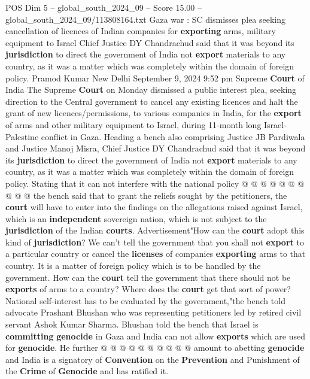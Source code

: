 \begin{textsample}{POS Dim 5 – global\_south\_2024\_09 – Score 15.00 – global\_south\_2024\_09/113808164.txt}  \label{ex:f5_pos_252}
Gaza war : SC dismisses plea seeking cancellation of licences of Indian companies for \textbf{exporting} arms, military equipment to Israel Chief Justice DY Chandrachud said that it was beyond its \textbf{jurisdiction} to direct the government of India not \textbf{export} materials to any country, as it was a matter which was completely within the domain of foreign policy.
Pramod Kumar New Delhi September 9, 2024 9:52 pm Supreme \textbf{Court} of India The Supreme \textbf{Court} on Monday dismissed a public interest plea, seeking direction to the Central government to cancel any existing licences and halt the grant of new licences/permissions, to various companies in India, for the \textbf{export} of arms and other military equipment to Israel, during 11-month long Israel-Palestine conflict in Gaza.
Heading a bench also comprising Justice JB Pardiwala and Justice Manoj Misra, Chief Justice DY Chandrachud said that it was beyond its \textbf{jurisdiction} to direct the government of India not \textbf{export} materials to any country, as it was a matter which was completely within the domain of foreign policy.
Stating that it can not interfere with the national policy @ @ @ @ @ @ @ @ @ @ the bench said that to grant the reliefs sought by the petitioners, the \textbf{court} will have to enter into the findings on the allegations raised against Israel, which is an \textbf{independent} sovereign nation, which is not subject to the \textbf{jurisdiction} of the Indian \textbf{courts}.
Advertisement"How can the \textbf{court} adopt this kind of \textbf{jurisdiction}?
We can't tell the government that you shall not \textbf{export} to a particular country or cancel the \textbf{licenses} of companies \textbf{exporting} arms to that country.
It is a matter of foreign policy which is to be handled by the government.
How can the \textbf{court} tell the government that there should not be \textbf{exports} of arms to a country?
Where does the \textbf{court} get that sort of power?
National self-interest has to be evaluated by the government,"the bench told advocate Prashant Bhushan who was representing petitioners led by retired civil servant Ashok Kumar Sharma.
Bhushan told the bench that Israel is \textbf{committing} \textbf{genocide} in Gaza and India can not allow \textbf{exports} which are used for \textbf{genocide}.
He further @ @ @ @ @ @ @ @ @ @ amount to abetting \textbf{genocide} and India is a signatory of \textbf{Convention} on the \textbf{Prevention} and Punishment of the \textbf{Crime} of \textbf{Genocide} and has ratified it.

\end{textsample}
